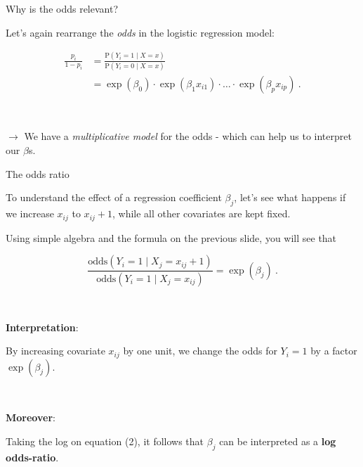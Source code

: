 \documentclass[
  10pt,
  ignorenonframetext,
]{beamer}
\begin{document}
\begin{frame}
\begin{block}{Why is the odds relevant?}
\protect\hypertarget{why-is-the-odds-relevant}{}
\vspace{2mm}

Let's again rearrange the \emph{odds} in the logistic regression model:

\begin{align*}
 \frac{p_i}{1-p_i} &=  \frac{\text{P}(Y_i=1 \mid X=x)}{\text{P}(Y_i=0 \mid X = x)} \\[2mm]
 &= \exp(\beta_0) \cdot \exp(\beta_1 x_{i1}) \cdot \ldots \cdot  \exp(\beta_p x_{ip}) \ .
 \end{align*}

\(~\)

\(\rightarrow\) We have a \emph{multiplicative model} for the odds -
which can help us to interpret our \(\beta\)s.
\end{block}
\end{frame}

\begin{frame}
\begin{block}{The odds ratio}
\protect\hypertarget{the-odds-ratio}{}
\(~\)

To understand the effect of a regression coefficient \(\beta_j\), let's
see what happens if we increase \(x_{ij}\) to \(x_{ij}+1\), while all
other covariates are kept fixed.

\vspace{2mm}

Using simple algebra and the formula on the previous slide, you will see
that

\begin{equation}
\frac{\text{odds}(Y_i=1 \mid X_{j} = x_{ij} + 1)}{\text{odds}(Y_i=1 \mid X_j = x_{ij})} = \exp(\beta_j)  \ .
\end{equation}

\vspace{2mm}

\(~\)

\textbf{Interpretation}:

By increasing covariate \(x_{ij}\) by one unit, we change the odds for
\(Y_i=1\) by a factor \(\exp(\beta_j)\).

\(~\)

\textbf{Moreover}:

Taking the log on equation (2), it follows that \(\beta_j\) can be
interpreted as a \textbf{log odds-ratio}.
\end{block}
\end{frame}
\end{document}
